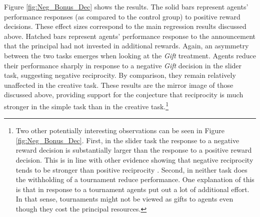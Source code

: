 
Figure \ref{fig:Neg_Bonus_Dec} shows the results. The solid bars represent 
agents' performance responses (as compared to the control group) to positive reward decisions. 
These effect sizes correspond to the main regression results discussed above. 
Hatched bars represent agents' performance response 
to the announcement that the principal had not invested in additional rewards.
Again, an asymmetry between the two tasks emerges when looking at 
the \textit{Gift} treatment.  Agents  reduce their performance sharply 
in response to a negative \textit{Gift} decision in the slider task, suggesting negative reciprocity.
By comparison, they remain relatively unaffected in the creative 
task. 
These results are the mirror image of those discussed above, providing 
support for the conjecture that reciprocity is much stronger in the simple task than in the creative task.\footnote{
Two other potentially interesting observations can be seen in Figure  \ref{fig:Neg_Bonus_Dec}.
First, in the slider task the response to a negative reward decision 
is substantially larger than the response to a positive reward decision. 
This is in line with other evidence showing that negative reciprocity 
tends to be stronger than positive reciprocity \citep{Kube13JEEA}. 
Second, in neither task does the withholding of a tournament reduce performance. 
 One explanation of this is that in response to a tournament agents put out a lot of additional effort. In that sense, tournaments 
might not be viewed as gifts to agents even though they cost the principal resources.} 







